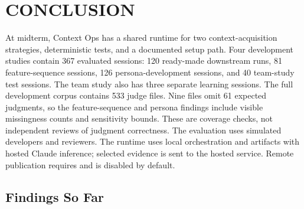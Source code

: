 \chapter{CONCLUSION}
\label{ch:conclusion}

At midterm, Context Ops has a shared runtime for two context-acquisition strategies, deterministic tests, and a documented setup path. Four development studies contain 367 evaluated sessions: 120 ready-made downstream runs, 81 feature-sequence sessions, 126 persona-development sessions, and 40 team-study test sessions. The team study also has three separate learning sessions. The full development corpus contains 533 judge files. Nine files omit 61 expected judgments, so the feature-sequence and persona findings include visible missingness counts and sensitivity bounds. These are coverage checks, not independent reviews of judgment correctness. The evaluation uses simulated developers and reviewers. The runtime uses local orchestration and artifacts with hosted Claude inference; selected evidence is sent to the hosted service. Remote publication requires  and is disabled by default.

\section{Findings So Far}

